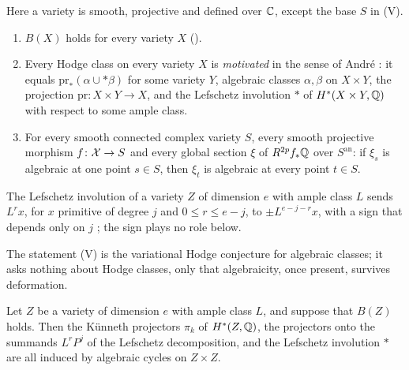 \begin{definition}\label{def:lmv}
Here a variety is smooth, projective and defined over $\mathbb{C}$, except the base
$S$ in \textup{(V)}.
\begin{enumerate}[leftmargin=3.0em,itemsep=3pt]
\item[\textup{(L)}] $B(X)$ holds for every variety $X$ ().
\item[\textup{(M)}] Every Hodge class on every variety $X$ is
  \emph{motivated} in the sense of Andr\'e \cite[\S2.1]{And96b}: it equals
  $\mathrm{pr}_{*}(\alpha\cup{*}\beta)$ for some variety $Y$, algebraic
  classes $\alpha,\beta$ on $X\times Y$, the projection
  $\mathrm{pr}\colon X\times Y\to X$, and the Lefschetz involution ${*}$ of
  $H^{*}(X\times Y,\mathbb{Q})$ with respect to some ample class.
\item[\textup{(V)}] For every smooth connected complex variety $S$, every
  smooth projective morphism $f\colon\mathcal{X}\to S$ and every global section $\xi$
  of $R^{2p}f_{*}\mathbb{Q}$ over $S^{\mathrm{an}}$: if $\xi_{s}$ is algebraic at one
  point $s\in S$, then $\xi_{t}$ is algebraic at every point $t\in S$.
\end{enumerate}
The Lefschetz involution of a variety $Z$ of dimension $e$ with ample class
$L$ sends $L^{r}x$, for $x$ primitive of degree $j$ and $0\le r\le e-j$, to
$\pm L^{e-j-r}x$, with a sign that depends only on $j$ \cite{And96b}; the
sign plays no role below.
\end{definition}

The statement (V) is the variational Hodge conjecture for algebraic classes;
it asks nothing about Hodge classes, only that algebraicity, once present,
survives deformation.

\begin{lemma}[Kleiman]\label{lem:lefinvolution}
Let $Z$ be a variety of dimension $e$ with ample class $L$, and suppose that
$B(Z)$ holds. Then the K\"unneth projectors $\pi_{k}$ of $H^{*}(Z,\mathbb{Q})$, the
projectors onto the summands $L^{r}P^{j}$ of the Lefschetz decomposition, and
the Lefschetz involution ${*}$ are all induced by algebraic cycles on
$Z\times Z$.
\end{lemma}

